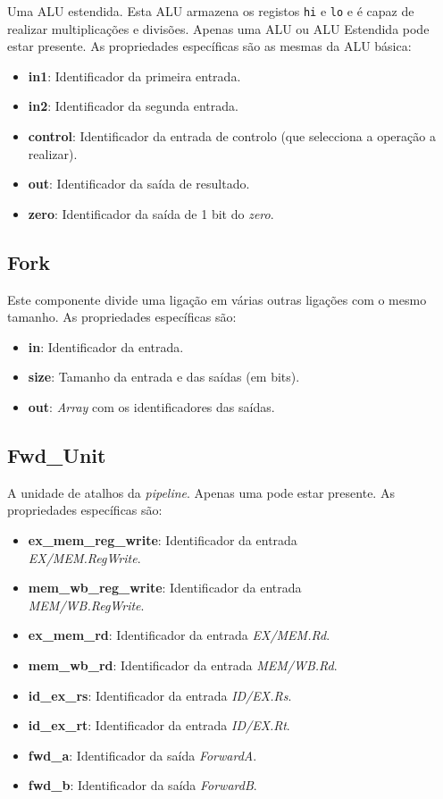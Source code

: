 \documentclass[11pt,a4paper,twoside,titlepage]{report}
\begin{document}
Uma ALU estendida. Esta ALU armazena os registos \verb+hi+ e \verb+lo+ e é capaz
de realizar multiplicações e divisões.
Apenas uma ALU ou ALU Estendida pode estar presente. As propriedades específicas
são as mesmas da ALU básica:
\begin{itemize}
	\item \textbf{in1}: Identificador da primeira entrada.
	\item \textbf{in2}: Identificador da segunda entrada.
	\item \textbf{control}: Identificador da entrada de controlo (que selecciona
		a operação a realizar).
	\item \textbf{out}: Identificador da saída de resultado.
	\item \textbf{zero}: Identificador da saída de 1 bit do \emph{zero}.
\end{itemize}

\subsection{Fork}

Este componente divide uma ligação em várias outras ligações com o mesmo tamanho.
As propriedades específicas são:
\begin{itemize}
	\item \textbf{in}: Identificador da entrada.
	\item \textbf{size}: Tamanho da entrada e das saídas (em bits).
	\item \textbf{out}: \emph{Array} com os identificadores das saídas.
\end{itemize}

\subsection{Fwd\_Unit}

A unidade de atalhos da \emph{pipeline}. Apenas uma pode estar presente.
As propriedades específicas são:
\begin{itemize}
	\item \textbf{ex\_mem\_reg\_write}: Identificador da entrada\\ \emph{EX/MEM.RegWrite}.
	\item \textbf{mem\_wb\_reg\_write}: Identificador da entrada\\ \emph{MEM/WB.RegWrite}.
	\item \textbf{ex\_mem\_rd}: Identificador da entrada \emph{EX/MEM.Rd}.
	\item \textbf{mem\_wb\_rd}: Identificador da entrada \emph{MEM/WB.Rd}.
	\item \textbf{id\_ex\_rs}: Identificador da entrada \emph{ID/EX.Rs}.
	\item \textbf{id\_ex\_rt}: Identificador da entrada \emph{ID/EX.Rt}.
	\item \textbf{fwd\_a}: Identificador da saída \emph{ForwardA}.
	\item \textbf{fwd\_b}: Identificador da saída \emph{ForwardB}.
\end{itemize}
\end{document}
